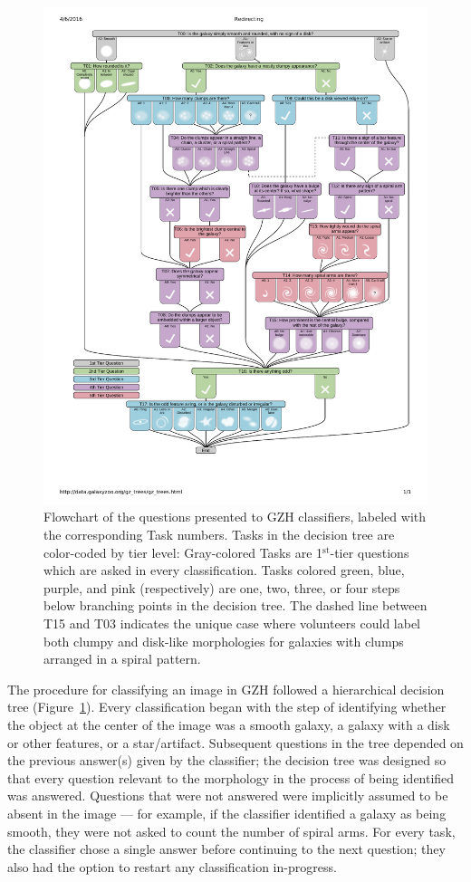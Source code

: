 \documentclass[twocolumn]{aastex6}
\begin{document}
\begin{figure}
\center
\includegraphics[width=\textwidth]{figures/gzh_decision_tree.pdf}
\caption{Flowchart of the questions presented to GZH classifiers, labeled with
the corresponding Task numbers. Tasks in the decision tree are color-coded by
tier level: Gray-colored Tasks are 1$^\mathrm{st}$-tier questions which are
asked in every classification. Tasks colored green, blue, purple, and pink
(respectively) are one, two, three, or four steps below branching points in the
decision tree. The dashed line between T15 and T03 indicates the unique case
where volunteers could label both clumpy and disk-like morphologies for
galaxies with clumps arranged in a spiral pattern.}
\label{fig:decisiontree}
\end{figure}

The procedure for classifying an image in GZH followed a hierarchical decision
tree (Figure~\ref{fig:decisiontree}). Every classification began with the step of
identifying whether the object at the center of the image was a smooth galaxy,
a galaxy with a disk or other features, or a star/artifact. Subsequent
questions in the tree depended on the previous answer(s) given by the classifier; the
decision tree was designed so that every question relevant to
the morphology in the process of being identified was answered. Questions that were not
answered were implicitly assumed to be absent in the image --- for example, if
the classifier identified a galaxy as being smooth, they were not asked to count the
number of spiral arms. For every task, the classifier chose a single answer before
continuing to the next question; they also had the option to restart any
classification in-progress. 
\end{document}
